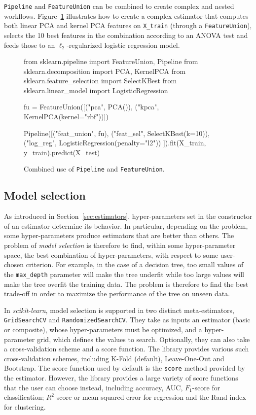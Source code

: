 \documentclass{llncs}
\newcommand{\sklearn}{\textit{scikit-learn}\xspace}
\begin{document}
\texttt{Pipeline} and \texttt{FeatureUnion} can be
combined to create complex and nested workflows.
Figure~\ref{union+pipeline} illustrates how to create a complex estimator
that computes both linear PCA and kernel PCA features on \texttt{X\_train}
(through a \texttt{FeatureUnion}),
selects the 10 best features in the combination according to an ANOVA test
and feeds those to an $\ell_2$-regularized logistic regression model.

\begin{figure}[h]
\begin{pythoncode}
from sklearn.pipeline import FeatureUnion, Pipeline
from sklearn.decomposition import PCA, KernelPCA
from sklearn.feature_selection import SelectKBest
from sklearn.linear_model import LogisticRegression

fu = FeatureUnion([("pca", PCA()),
                   ("kpca", KernelPCA(kernel="rbf"))])

Pipeline([("feat_union", fu),
          ("feat_sel", SelectKBest(k=10)),
          ("log_reg", LogisticRegression(penalty="l2"))
]).fit(X_train, y_train).predict(X_test)
\end{pythoncode}
\caption{Combined use of \texttt{Pipeline} and \texttt{FeatureUnion}.}
\label{union+pipeline}
\end{figure}

\subsection{Model selection}

As introduced in Section~\ref{sec:estimators}, hyper-parameters set in the
constructor of an estimator determine its behavior. In particular, depending on
the problem, some hyper-parameters produce estimators that are better than
others. The problem of \textit{model selection} is therefore to find, within
some hyper-parameter space, the best combination of hyper-parameters, with
respect to some user-chosen criterion. For example, in the case of a decision
tree, too small values of the \texttt{max\_depth} parameter will make the tree
underfit while too large values will make the tree overfit the training data.
The problem is therefore to find the best trade-off in order to maximize
the performance of the tree on unseen data.

In \sklearn, model selection is supported in two distinct meta-estimators,
\texttt{GridSearchCV} and \texttt{RandomizedSearchCV}.  They take as inputs an
estimator (basic or composite), whose hyper-parameters must be optimized, and a
hyper-parameter grid, which defines the values to search. Optionally, they can
also take a cross-validation scheme and a score function.  The library provides
various such cross-validation schemes, including K-Fold (default), Leave-One-Out
and Bootstrap. The score function used by default is the \texttt{score} method
provided by the estimator. However, the library provides a large variety of
score functions that the user can choose instead,
including accuracy, AUC, $F_1$-score for classification;
$R^2$ score or mean squared error for regression
and the Rand index for clustering.
\end{document}
